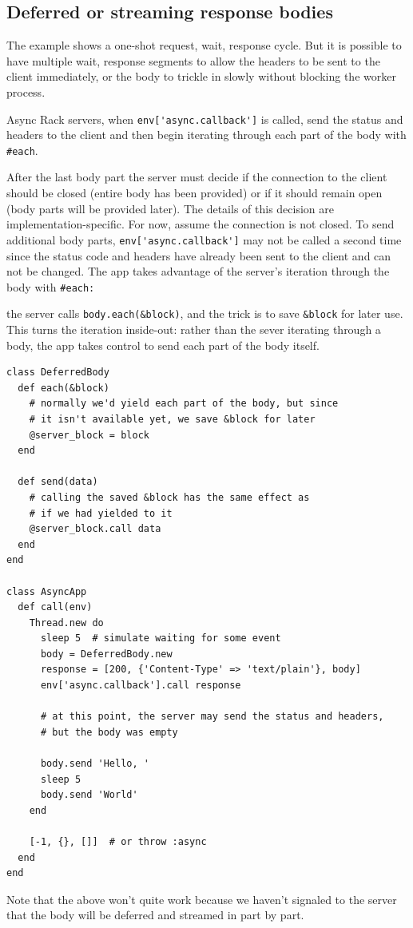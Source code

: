 \subsection{Deferred or streaming response bodies}

The example shows a one-shot request, wait, response cycle. But it
is possible to have multiple wait, response segments to allow the
headers to be sent to the client immediately, or the body to trickle
in slowly without blocking the worker process. 

Async Rack servers,
when \verb|env['async.callback']| is called, send the status and headers
to the client and then begin iterating through each part of the
body with \verb|#each|. 

After the last body part the server must decide
if the connection to the client should be closed (entire body has
been provided) or if it should remain open (body parts will be
provided later). The details of this decision are implementation-specific.
For now, assume the connection is not closed. To send additional
body parts, \verb|env['async.callback']| may not be called a second time
since the status code and headers have already been sent to the
client and can not be changed. The app takes advantage of the
server's iteration through the body with \verb|#each:| 

the server calls
\verb|body.each(&block)|, 
and the trick is to save \verb|&block| for later use.
This turns the iteration inside-out: rather than the sever iterating
through a body, the app takes control to send each part of the body
itself.
\begin{verbatim}
class DeferredBody
  def each(&block)
    # normally we'd yield each part of the body, but since
    # it isn't available yet, we save &block for later
    @server_block = block
  end

  def send(data)
    # calling the saved &block has the same effect as
    # if we had yielded to it
    @server_block.call data
  end
end

class AsyncApp
  def call(env)
    Thread.new do
      sleep 5  # simulate waiting for some event
      body = DeferredBody.new
      response = [200, {'Content-Type' => 'text/plain'}, body]
      env['async.callback'].call response

      # at this point, the server may send the status and headers,
      # but the body was empty
      
      body.send 'Hello, '
      sleep 5
      body.send 'World'
    end
    
    [-1, {}, []]  # or throw :async
  end
end
\end{verbatim}
Note that the above won't quite work because we haven't signaled to the server that the body will be deferred and streamed in part by part.


